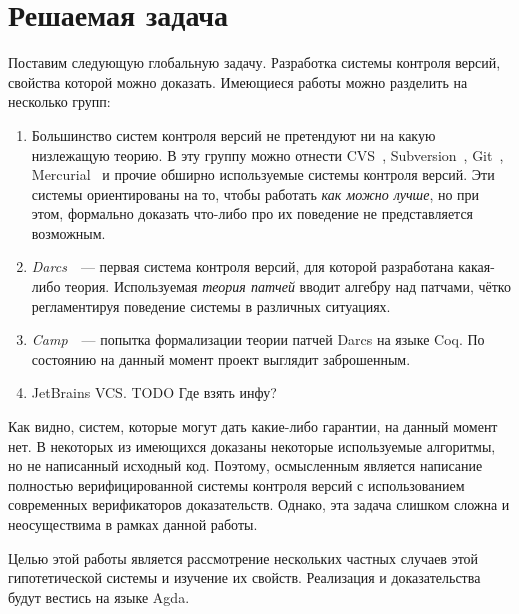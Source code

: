 \section{Решаемая задача}

Поставим следующую глобальную задачу. Разработка системы контроля
версий, свойства которой можно доказать. Имеющиеся работы можно
разделить на несколько групп:

\begin{enumerate}
\item Большинство систем контроля версий не претендуют ни на какую
  низлежащую теорию. В эту группу можно отнести CVS~\cite{cvs},
  Subversion~\cite{svnbook}, Git~\cite{progit},
  Mercurial~\cite{mercurial} %
  и прочие обширно используемые системы контроля версий. Эти системы
  ориентированы на то, чтобы работать \emph{как можно лучше}, но при
  этом, формально доказать что-либо про их поведение не представляется
  возможным.
\item \emph{Darcs}~\cite{darcs}~--- первая система контроля версий,
  для которой разработана какая-либо теория. Используемая \emph{теория
    патчей} вводит алгебру над патчами, чётко регламентируя поведение
  системы в различных ситуациях.
\item \emph{Camp}~\cite{camp}~--- попытка формализации теории патчей
  Darcs на языке Coq. По состоянию на данный момент проект выглядит
  заброшенным.
\item JetBrains VCS.
TODO Где взять инфу?
\end{enumerate}

Как видно, систем, которые могут дать какие-либо гарантии, на данный
момент нет. В некоторых из имеющихся доказаны некоторые используемые
алгоритмы, но не написанный исходный код. Поэтому, осмысленным
является написание полностью верифицированной системы контроля версий
с использованием современных верификаторов доказательств.
Однако, эта задача слишком сложна и неосуществима в рамках данной
работы.

Целью этой работы является рассмотрение нескольких частных случаев
этой гипотетической системы и изучение их свойств. Реализация и
доказательства будут вестись на языке Agda.
